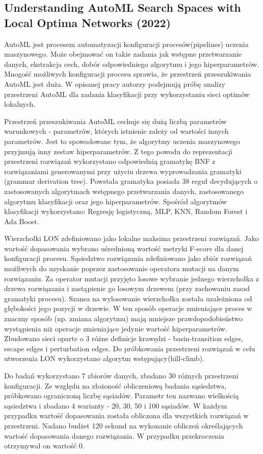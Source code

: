 \subsection*{Understanding AutoML Search Spaces with Local Optima Networks (2022) \cite{DBLP:conf/gecco/TeixeiraP22}}
AutoML jest procesem automatyzacji konfiguracji procesów(pipelines) uczenia maszynowego.
Może obejmować on takie zadania jak wstępne przetwarzanie danych, ekstrakcja cech, dobór odpowiedniego algorytmu i jego hiperparametrów.
Mnogość możliwych konfiguracji procesu sprawia, że przestrzeń przeszukiwania AutoML jest duża.
W opisanej pracy autorzy podejmują próbę analizy przestrzeni AutoML dla zadania klasyfikacji przy wykorzystaniu sieci optimów lokalnych.

Przestrzeń przeszukiwania AutoML cechuje się dużą liczbą parametrów warunkowych - parametrów, których istnienie zależy od wartości innych parametrów.
Jest to spowodowane tym, że algorytmy uczenia maszynowego przyjmują inny zestaw hiperparametrów.
Z tego powodu do reprezentacji przestrzeni rozwiązań wykorzystano odpowiednią gramatykę BNF z rozwiązaniami generowanymi
przy użyciu drzewa wyprowadzania gramatyki (grammar derivation tree).
Powstała gramatyka posiada 38 reguł decydujących o zastosowanych algorytmach wstępnego przetwarzania danych,
zastosowanego algorytmu klasyfikacji oraz jego hiperparametrów.
Spośród algorytmów klasyfikacji wykorzystano: Regresję logistyczną, MLP, KNN, Random Forest i Ada Boost.

Wierzchołki LON zdefiniowano jako lokalne maksima przestrzeni rozwiązań.
Jako wartość dopasowania wybrano uśrednioną wartość metryki F-score dla danej konfiguracji procesu.
Sąsiedztwo rozwiązania zdefiniowano jako zbiór rozwiązań możliwych do uzyskanie poprzez zastosowanie operatora
mutacji na danym rozwiązaniu. Za operator mutacji przyjęto losowe wybranie jednego wierzchołka z drzewa rozwiązania
i zastąpienie go losowym drzewem (przy zachowaniu zasad gramatyki procesu). Szansa na wylosowanie wierzchołka
została uzależniona od głębokości jego pozycji w drzewie. W ten sposób operacje zmieniające proces w znaczny sposób
(np. zmiana algorytmu) mają mniejsze prawdopodobieństwo wystąpienia niż operacje zmieniające jedynie wartość hiperparametrów.
Zbudowano sieci oparte o 3 różne definicje krawędzi - basin-transition edges, escape edges i perturbation edges.
Do próbkowania przestrzeni rozwiązań w celu utworzenia LON wykorzystano algorytm wstępujący(hill-climb).

Do badań wykorzystano 7 zbiorów danych, zbadano 30 różnych przestrzeni konfiguracji.
Ze względu na złożoność obliczeniową badania sąsiedztwa, próbkowano ograniczoną liczbę sąsiadów.
Parametr ten nazwano wielkością sąsiedztwa i zbadano 4 warianty - 20, 30, 50 i 100 sąsiadów.
W każdym przypadku wartość dopasowania została obliczona dla wszystkich rozwiązań w przestrzeni.
Nadano budżet 120 sekund na wykonanie obliczeń określających wartość dopasowania danego rozwiązania.
W przypadku przekroczenia otrzymywał on wartość 0.

